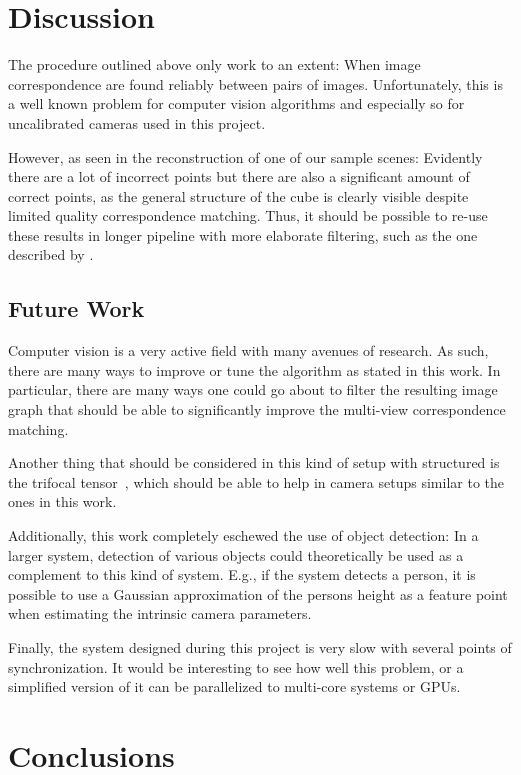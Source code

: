 \documentclass[preprint,acmtog]{acmart}
\begin{document}
\section{Discussion}

The procedure outlined above only work to an extent: When image correspondence
are found reliably between pairs of images. Unfortunately, this is a well known
problem for computer vision algorithms and especially so for uncalibrated
cameras used in this project.

However, as seen in the reconstruction of one of our sample scenes: Evidently
there are a lot of incorrect points but there are also a significant amount of
correct points, as the general structure of the cube is clearly visible despite
limited quality correspondence matching. Thus, it should be possible to re-use
these results in longer pipeline with more elaborate filtering, such as the one
described by \cite{ftc2016}.



\subsection{Future Work}

Computer vision is a very active field with many avenues of research. As such,
there are many ways to improve or tune the algorithm as stated in this work. In
particular, there are many ways one could go about to filter the resulting image
graph that should be able to significantly improve the multi-view correspondence
matching.

Another thing that should be considered in this kind of setup with structured is
the trifocal tensor~\cite{Martyushev_2017}, which should be able to help in
camera setups similar to the ones in this work.

Additionally, this work completely eschewed the use of object detection: In a
larger system, detection of various objects could theoretically be used as a
complement to this kind of system. E.g., if the system detects a person, it is
possible to use a Gaussian approximation of the persons height as a feature
point when estimating the intrinsic camera parameters.

Finally, the system designed during this project is very slow with several
points of synchronization. It would be interesting to see how well this problem,
or a simplified version of it can be parallelized to multi-core systems or GPUs.


\section{Conclusions}



\begin{acks}
\end{acks}



\end{document}
